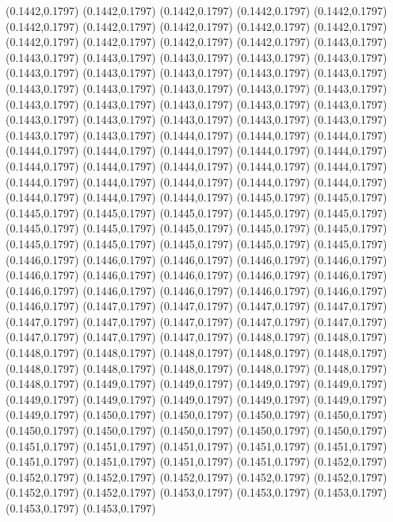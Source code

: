 (0.1442,0.1797)
(0.1442,0.1797)
(0.1442,0.1797)
(0.1442,0.1797)
(0.1442,0.1797)
(0.1442,0.1797)
(0.1442,0.1797)
(0.1442,0.1797)
\PST@Solid(0.1442,0.1797)
(0.1442,0.1797)
(0.1442,0.1797)
(0.1442,0.1797)
(0.1442,0.1797)
(0.1442,0.1797)
(0.1443,0.1797)
(0.1443,0.1797)
(0.1443,0.1797)
(0.1443,0.1797)
(0.1443,0.1797)
(0.1443,0.1797)
(0.1443,0.1797)
(0.1443,0.1797)
(0.1443,0.1797)
(0.1443,0.1797)
(0.1443,0.1797)
(0.1443,0.1797)
(0.1443,0.1797)
(0.1443,0.1797)
(0.1443,0.1797)
(0.1443,0.1797)
(0.1443,0.1797)
(0.1443,0.1797)
(0.1443,0.1797)
(0.1443,0.1797)
(0.1443,0.1797)
(0.1443,0.1797)
(0.1443,0.1797)
(0.1443,0.1797)
(0.1443,0.1797)
(0.1443,0.1797)
(0.1443,0.1797)
(0.1443,0.1797)
(0.1444,0.1797)
(0.1444,0.1797)
(0.1444,0.1797)
(0.1444,0.1797)
(0.1444,0.1797)
(0.1444,0.1797)
(0.1444,0.1797)
(0.1444,0.1797)
(0.1444,0.1797)
(0.1444,0.1797)
(0.1444,0.1797)
(0.1444,0.1797)
(0.1444,0.1797)
(0.1444,0.1797)
(0.1444,0.1797)
(0.1444,0.1797)
(0.1444,0.1797)
(0.1444,0.1797)
(0.1444,0.1797)
(0.1444,0.1797)
(0.1444,0.1797)
(0.1445,0.1797)
(0.1445,0.1797)
(0.1445,0.1797)
(0.1445,0.1797)
(0.1445,0.1797)
(0.1445,0.1797)
(0.1445,0.1797)
(0.1445,0.1797)
(0.1445,0.1797)
(0.1445,0.1797)
(0.1445,0.1797)
(0.1445,0.1797)
(0.1445,0.1797)
(0.1445,0.1797)
(0.1445,0.1797)
(0.1445,0.1797)
(0.1445,0.1797)
(0.1446,0.1797)
(0.1446,0.1797)
(0.1446,0.1797)
(0.1446,0.1797)
(0.1446,0.1797)
(0.1446,0.1797)
(0.1446,0.1797)
(0.1446,0.1797)
(0.1446,0.1797)
(0.1446,0.1797)
(0.1446,0.1797)
(0.1446,0.1797)
(0.1446,0.1797)
(0.1446,0.1797)
(0.1446,0.1797)
(0.1446,0.1797)
(0.1447,0.1797)
(0.1447,0.1797)
(0.1447,0.1797)
(0.1447,0.1797)
(0.1447,0.1797)
(0.1447,0.1797)
(0.1447,0.1797)
(0.1447,0.1797)
(0.1447,0.1797)
(0.1447,0.1797)
(0.1447,0.1797)
(0.1447,0.1797)
(0.1448,0.1797)
\PST@Solid(0.1448,0.1797)
(0.1448,0.1797)
(0.1448,0.1797)
(0.1448,0.1797)
(0.1448,0.1797)
(0.1448,0.1797)
(0.1448,0.1797)
(0.1448,0.1797)
(0.1448,0.1797)
(0.1448,0.1797)
(0.1448,0.1797)
(0.1448,0.1797)
(0.1449,0.1797)
(0.1449,0.1797)
(0.1449,0.1797)
(0.1449,0.1797)
(0.1449,0.1797)
(0.1449,0.1797)
(0.1449,0.1797)
(0.1449,0.1797)
(0.1449,0.1797)
(0.1449,0.1797)
(0.1450,0.1797)
(0.1450,0.1797)
(0.1450,0.1797)
(0.1450,0.1797)
(0.1450,0.1797)
(0.1450,0.1797)
(0.1450,0.1797)
(0.1450,0.1797)
(0.1450,0.1797)
(0.1451,0.1797)
(0.1451,0.1797)
(0.1451,0.1797)
(0.1451,0.1797)
(0.1451,0.1797)
(0.1451,0.1797)
(0.1451,0.1797)
(0.1451,0.1797)
(0.1451,0.1797)
(0.1452,0.1797)
(0.1452,0.1797)
(0.1452,0.1797)
(0.1452,0.1797)
(0.1452,0.1797)
(0.1452,0.1797)
(0.1452,0.1797)
(0.1452,0.1797)
(0.1453,0.1797)
(0.1453,0.1797)
(0.1453,0.1797)
(0.1453,0.1797)
(0.1453,0.1797)
